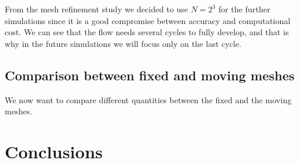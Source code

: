 \documentclass[a4paper,11pt,openright,twoside]{book}
\begin{document}
From the mesh refinement study we decided to use $N=2^3$ for the further simulations since it is a good compromise between accuracy and computational cost.
We can see that the flow needs several cycles to fully develop, and that is why in the future simulations we will focus only on the last cycle.


\section{Comparison between fixed and moving meshes}
We now want to compare different quantities between the fixed and the moving meshes. 



\chapter{Conclusions}
\end{document}
